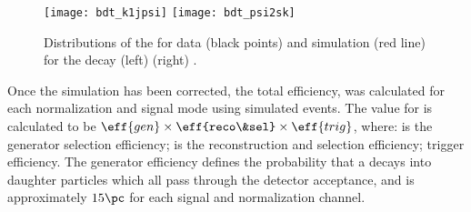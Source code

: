 \begin{figure}[t]
  \begin{center}
    \texttt{[image: bdt\_k1jpsi]}
    \texttt{[image: bdt\_psi2sk]}
    \caption[Distributions of BDT response in data and simulation]
    {
      Distributions of the \BDT for data (black points) and simulation (red line) for the decay
      (left) 
      (right) \btopsitwosk.
    }
    \label{fig:kpipi:bdt}
  \end{center}
\end{figure}

Once the simulation has been corrected, the total efficiency,  was calculated for each
normalization and signal mode using simulated events.
The value for  is calculated to be $\eff{gen}\times\eff{reco\&sel}\times\eff{trig}$, where:
 is the generator selection efficiency;
 is the reconstruction and selection efficiency;
 trigger efficiency.
The generator efficiency defines the probability that a \Bp decays into daughter particles which
all pass through the \lhcb detector acceptance, and is approximately $15\pc$ for each signal and
normalization channel.





